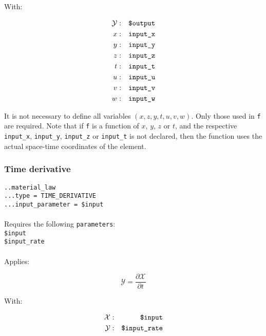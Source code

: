 \documentclass[10pt]{article}
\begin{document}
With:

\begin{eqnarray}
	\mathcal{Y} & : & \verb+$output+ \notag \\
	x & : & \verb+input_x+ \notag \\
	y & : & \verb+input_y+ \notag \\
	z & : & \verb+input_z+ \notag \\
	t & : & \verb+input_t+ \notag \\
	u & : & \verb+input_u+ \notag \\
	v & : & \verb+input_v+ \notag \\
	w & : & \verb+input_w+ \notag 
\end{eqnarray}

It is not necessary to define all variables $(x,z,y,t,u,v,w)$. Only those used in \verb+f+ are required. Note that if \verb+f+ is a function of $x$, $y$, $z$ or $t$, and the respective \verb+input_x+, \verb+input_y+, \verb+input_z+ or \verb+input_t+ is not declared, then the function uses the actual space-time coordinates of the element.

\subsubsection{Time derivative}

\noindent \verb+..material_law+\\
\verb+...type = TIME_DERIVATIVE+\\
\verb+...input_parameter = $input+

\paragraph{}Requires the following \verb+parameters+:\\

\noindent \verb+$input+\\
\verb+$input_rate+

\paragraph{}Applies:

\begin{equation}
	\mathcal{Y} = \frac{\partial \mathcal{X}}{\partial t}
\end{equation}

With:

\begin{eqnarray}
	\mathcal{X} & : & \verb+$input+ \notag \\
	\mathcal{Y} & : & \verb+$input_rate+ \notag
\end{eqnarray}
\end{document}

